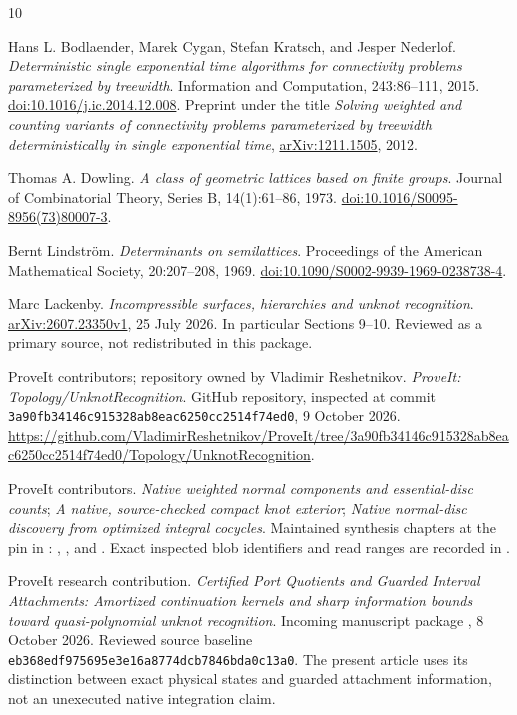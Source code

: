 \begin{thebibliography}{10}
\raggedright
{}
Hans L. Bodlaender, Marek Cygan, Stefan Kratsch, and Jesper Nederlof.
\emph{Deterministic single exponential time algorithms for connectivity problems parameterized by treewidth}.
Information and Computation, 243:86--111, 2015.
\href{https://doi.org/10.1016/j.ic.2014.12.008}{doi:10.1016/j.ic.2014.12.008}.
Preprint under the title \emph{Solving weighted and counting variants of connectivity problems parameterized by treewidth deterministically in single exponential time},
\href{https://arxiv.org/abs/1211.1505}{arXiv:1211.1505}, 2012.

Thomas A. Dowling.
\emph{A class of geometric lattices based on finite groups}.
Journal of Combinatorial Theory, Series B, 14(1):61--86, 1973.
\href{https://doi.org/10.1016/S0095-8956(73)80007-3}{doi:10.1016/S0095-8956(73)80007-3}.

Bernt Lindstr\"om.
\emph{Determinants on semilattices}.
Proceedings of the American Mathematical Society, 20:207--208, 1969.
\href{https://doi.org/10.1090/S0002-9939-1969-0238738-4}{doi:10.1090/S0002-9939-1969-0238738-4}.

Marc Lackenby.
\emph{Incompressible surfaces, hierarchies and unknot recognition}.
\href{https://arxiv.org/abs/2607.23350}{arXiv:2607.23350v1}, 25 July 2026.
In particular Sections 9--10. Reviewed as a primary source, not redistributed in this package.

ProveIt contributors; repository owned by Vladimir Reshetnikov.
\emph{ProveIt: Topology/UnknotRecognition}.
GitHub repository, inspected at commit
\texttt{3a90fb34146c915328ab8eac6250cc2514f74ed0}, 9 October 2026.
\url{https://github.com/VladimirReshetnikov/ProveIt/tree/3a90fb34146c915328ab8eac6250cc2514f74ed0/Topology/UnknotRecognition}.

ProveIt contributors.
\emph{Native weighted normal components and essential-disc counts};
\emph{A native, source-checked compact knot exterior};
\emph{Native normal-disc discovery from optimized integral cocycles}.
Maintained synthesis chapters at the pin in \cite{repo}:
,
, and
.
Exact inspected blob identifiers and read ranges are recorded in
.

ProveIt research contribution.
\emph{Certified Port Quotients and Guarded Interval Attachments:
Amortized continuation kernels and sharp information bounds toward quasi-polynomial unknot recognition}.
Incoming manuscript package , 8 October 2026.
Reviewed source baseline \texttt{eb368edf975695e3e16a8774dcb7846bda0c13a0}.
The present article uses its distinction between exact physical states and guarded attachment information, not an unexecuted native integration claim.


\end{thebibliography}
